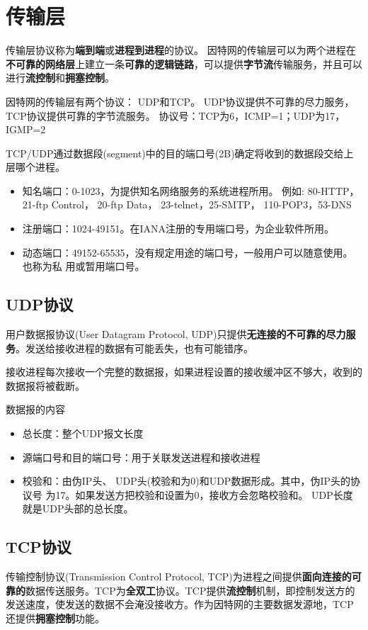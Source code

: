 
\section{传输层} %
传输层协议称为\textbf{端到端}或\textbf{进程到进程}的协议。 因特网的传输层可以为两个进程在\textbf{不可靠的网络层}上建立一条\textbf{可靠的逻辑链路}，可以提供\textbf{字节流}传输服务，并且可以进行\textbf{流控制}和\textbf{拥塞控制}。

因特网的传输层有两个协议： UDP和TCP。
UDP协议提供不可靠的尽力服务， TCP协议提供可靠的字节流服务。
协议号：TCP为6，ICMP=1；UDP为17，IGMP=2

TCP/UDP通过数据段(segment)中的目的端口号(2B)确定将收到的数据段交给上层哪个进程。
\begin{itemize}
    \item 知名端口：0-1023，为提供知名网络服务的系统进程所用。    例如: 80-HTTP， 21-ftp Control， 20-ftp Data， 23-telnet，25-SMTP， 110-POP3，53-DNS
    \item 注册端口：1024-49151。在IANA注册的专用端口号，为企业软件所用。
    \item 动态端口：49152-65535，没有规定用途的端口号，一般用户可以随意使用。也称为私    用或暂用端口号。
\end{itemize}

\subsection{UDP协议}
用户数据报协议(User Datagram Protocol, UDP)只提供\textbf{无连接的不可靠的尽力服务}。发送给接收进程的数据有可能丢失，也有可能错序。

接收进程每次接收一个完整的数据报，如果进程设置的接收缓冲区不够大，收到的数据报将被截断。

数据报的内容
\begin{itemize}
    \item 总长度：整个UDP报文长度
    \item 源端口号和目的端口号：用于关联发送进程和接收进程
    \item 校验和：由伪IP头、 UDP头(校验和为0)和UDP数据形成。其中，伪IP头的协议号
    为17。如果发送方把校验和设置为0，接收方会忽略校验和。 UDP长度就是UDP头部的总长度。
\end{itemize}


\subsection{TCP协议}
传输控制协议(Transmission Control Protocol, TCP)为进程之间提供\textbf{面向连接的可靠的}数据传送服务。TCP为\textbf{全双工}协议。TCP提供\textbf{流控制}机制，即控制发送方的发送速度，使发送的数据不会淹没接收方。作为因特网的主要数据发源地，TCP还提供\textbf{拥塞控制}功能。

